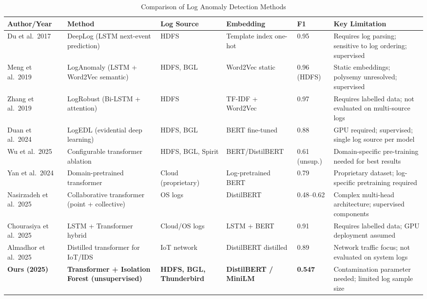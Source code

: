 \documentclass[conference]{IEEEtran}
\begin{document}
\begin{table}[!t]
\centering
\caption{Comparison of Log Anomaly Detection Methods}
\label{tab:related_work}
\renewcommand{\arraystretch}{1.25}
\begin{tabular}{@{}p{3.0cm}p{3.2cm}p{1.8cm}p{2.2cm}p{1.2cm}p{4.0cm}@{}}
\toprule
\textbf{Author/Year} & \textbf{Method} & \textbf{Log Source} & \textbf{Embedding} & \textbf{F1} & \textbf{Key Limitation} \\
\midrule
Du et al.\ 2017~\cite{du2017}
  & DeepLog (LSTM next-event prediction)
  & HDFS
  & Template index one-hot
  & 0.95
  & Requires log parsing; sensitive to log ordering; supervised \\
\midrule
Meng et al.\ 2019~\cite{meng2019}
  & LogAnomaly (LSTM + Word2Vec semantic)
  & HDFS, BGL
  & Word2Vec static
  & 0.96 (HDFS)
  & Static embeddings; polysemy unresolved; supervised \\
\midrule
Zhang et al.\ 2019~\cite{zhang2019}
  & LogRobust (Bi-LSTM + attention)
  & HDFS
  & TF-IDF + Word2Vec
  & 0.97
  & Requires labelled data; not evaluated on multi-source logs \\
\midrule
Duan et al.\ 2024~\cite{duan2024}
  & LogEDL (evidential deep learning)
  & HDFS, BGL
  & BERT fine-tuned
  & 0.88
  & GPU required; supervised; single log source per model \\
\midrule
Wu et al.\ 2025~\cite{wu2025}
  & Configurable transformer ablation
  & HDFS, BGL, Spirit
  & BERT/DistilBERT
  & 0.61 (unsup.)
  & Domain-specific pre-training needed for best results \\
\midrule
Yan et al.\ 2024~\cite{yan2024}
  & Domain-pretrained transformer
  & Cloud (proprietary)
  & Log-pretrained BERT
  & 0.79
  & Proprietary dataset; log-specific pretraining required \\
\midrule
Nasirzadeh et al.\ 2025~\cite{nasirzadeh2025}
  & Collaborative transformer (point + collective)
  & OS logs
  & DistilBERT
  & 0.48--0.62
  & Complex multi-head architecture; supervised components \\
\midrule
Chourasiya et al.\ 2025~\cite{chourasiya2025}
  & LSTM + Transformer hybrid
  & Cloud/OS logs
  & LSTM + BERT
  & 0.91
  & Requires labelled data; GPU deployment assumed \\
\midrule
Almadhor et al.\ 2025~\cite{almadhor2025}
  & Distilled transformer for IoT/IDS
  & IoT network
  & DistilBERT distilled
  & 0.89
  & Network traffic focus; not evaluated on system logs \\
\midrule
\textbf{Ours (2025)}
  & \textbf{Transformer + Isolation Forest (unsupervised)}
  & \textbf{HDFS, BGL, Thunderbird}
  & \textbf{DistilBERT / MiniLM}
  & \textbf{0.547}
  & Contamination parameter needed; limited log sample size \\
\bottomrule
\end{tabular}
\end{table}
\end{document}
